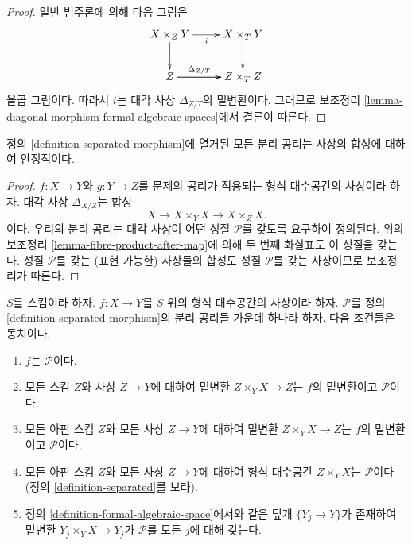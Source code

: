 \begin{proof}
일반 범주론에 의해 다음 그림은
$$
\xymatrix{
X \times_Z Y \ar[r]_i \ar[d] & X \times_T Y \ar[d] \\
Z \ar[r]^-{\Delta_{Z/T}} \ar[r] & Z \times_T Z %
}
$$
올곱 그림이다. 따라서 $i$는 대각 사상 $\Delta_{Z/T}$의 밑변환이다.
그러므로 보조정리
\ref{lemma-diagonal-morphism-formal-algebraic-spaces}에서 결론이 따른다.
\end{proof}

\begin{lemma}
\label{lemma-composition-separated}
정의 \ref{definition-separated-morphism}에 열거된 모든 분리 공리는
사상의 합성에 대하여 안정적이다.
\end{lemma}

\begin{proof}
$f : X \to Y$와 $g : Y \to Z$를 문제의 공리가 적용되는 형식
대수공간의 사상이라 하자. 대각 사상 $\Delta_{X/Z}$는 합성
$$
X \longrightarrow X \times_Y X \longrightarrow X \times_Z X.
$$
이다. 우리의 분리 공리는 대각 사상이 어떤 성질 $\mathcal{P}$를
갖도록 요구하여 정의된다. 위의 보조정리
\ref{lemma-fibre-product-after-map}에 의해 두 번째 화살표도 이 성질을
갖는다. 성질 $\mathcal{P}$를 갖는 (표현 가능한) 사상들의 합성도
성질 $\mathcal{P}$를 갖는 사상이므로 보조정리가 따른다.
\end{proof}

\begin{lemma}
\label{lemma-separated-local}
$S$를 스킴이라 하자. $f : X \to Y$를 $S$ 위의 형식 대수공간의
사상이라 하자. $\mathcal{P}$를 정의
\ref{definition-separated-morphism}의 분리 공리들 가운데 하나라 하자.
다음 조건들은 동치이다.
\begin{enumerate}
\item $f$는 $\mathcal{P}$이다.
\item 모든 스킴 $Z$와 사상 $Z \to Y$에 대하여 밑변환
$Z \times_Y X \to Z$는 $f$의 밑변환이고 $\mathcal{P}$이다.
\item 모든 아핀 스킴 $Z$와 모든 사상 $Z \to Y$에 대하여 밑변환
$Z \times_Y X \to Z$는 $f$의 밑변환이고 $\mathcal{P}$이다.
\item 모든 아핀 스킴 $Z$와 모든 사상 $Z \to Y$에 대하여 형식
대수공간 $Z \times_Y X$는 $\mathcal{P}$이다(정의
\ref{definition-separated}를 보라).
\item 정의 \ref{definition-formal-algebraic-space}에서와 같은 덮개
$\{Y_j \to Y\}$가 존재하여 밑변환
$Y_j \times_Y X \to Y_j$가 $\mathcal{P}$를 모든 $j$에 대해 갖는다.
\end{enumerate}
\end{lemma}

